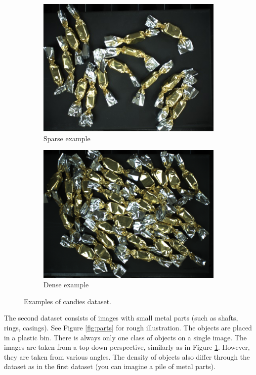 \begin{figure}[h]

\begin{subfigure}{0.5\textwidth}
\includegraphics[width=0.9\linewidth]{Sources/Figures/sparse.jpg} 
\caption{Sparse example}

\end{subfigure}
\begin{subfigure}{0.5\textwidth}
\includegraphics[width=0.9\linewidth]{Sources/Figures/dense.png}
\caption{Dense example}

\end{subfigure}

\caption{Examples of candies dataset.}
\label{fig:candies}
\end{figure}

 The second dataset consists of images with small metal parts (such as shafts, rings, casings). See Figure \ref{fig:parts} for rough illustration. The objects are placed in a plastic bin. There is always only one class of objects on a single image. The images are taken from a top-down perspective, similarly as in Figure \ref{fig:candies}. However, they are taken from various angles. The density of objects also differ through the dataset as in the first dataset (you can imagine a pile of metal parts).

